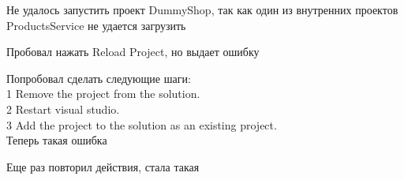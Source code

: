 \documentclass[a4paper,11pt]{article}
\begin{document}
Не удалось запустить проект DummyShop, так как один из внутренних проектов ProductsService не удается загрузить
\begin{center}
\label{fig:image}
\end{center}
Пробовал нажать Reload Project, но выдает ошибку
\begin{center}
\label{fig:image}
\end{center}
Попробовал сделать следующие шаги:\\
1 Remove the project from the solution.\\
2 Restart visual studio.\\
3 Add the project to the solution as an existing project.\\
Теперь такая ошибка
\begin{center}
\label{fig:image}
\end{center}
Еще раз повторил действия, стала такая
\begin{center}
\label{fig:image}
\end{center}
\end{document}
